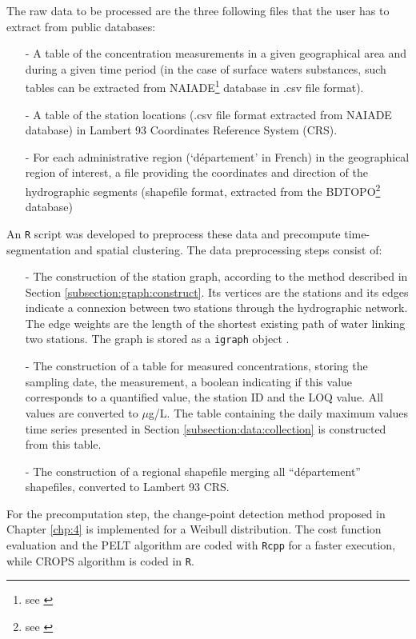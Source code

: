 The raw data to be processed are the three following files that the user has to extract from public databases:
\begin{itemize}
\item[-] A table of the concentration measurements in a given geographical area and during a given time period (in the case of surface waters substances, such tables can be extracted from NAIADE\footnote{see \cite{Naiade2}} database in .csv file format).
\item[-] A table of the station locations (.csv file format extracted from NAIADE database) in Lambert 93 Coordinates Reference System (CRS).
\item[-] For each administrative region (‘département’ in French) in the geographical region of interest, a file providing the coordinates and direction of the hydrographic segments (shapefile format, extracted from the BDTOPO\footnote{see \cite{BDTOPO}} database)
\end{itemize}
An \texttt{R} script was developed to preprocess these data and precompute time-segmentation and spatial clustering. The data preprocessing steps consist of: 
\begin{itemize}
\item[-] The construction of the station graph, according to the method described in Section \ref{subsection:graph:construct}. Its vertices are the stations and its edges indicate a connexion between two stations through the hydrographic network. The edge weights are the length of the shortest existing path of water linking two stations. The graph is stored as a \texttt{igraph} object \citep{igraph}. 
\item[-] The construction of a table for measured concentrations, storing the sampling date, the measurement, a boolean indicating if this value corresponds to a quantified value, the station ID and the LOQ value. All values are converted to $\mu$g/L. The table containing the daily maximum values time series presented in Section \ref{subsection:data:collection} is constructed from this table.
\item[-] The construction of a regional shapefile merging all ``département'' shapefiles, converted to Lambert 93 CRS.
\end{itemize}

For the precomputation step, the change-point detection method proposed in Chapter \ref{chp:4} is implemented for a Weibull distribution. The cost function evaluation and the PELT algorithm are coded with \texttt{Rcpp} for a faster execution, while CROPS algorithm is coded in \texttt{R}.
 
